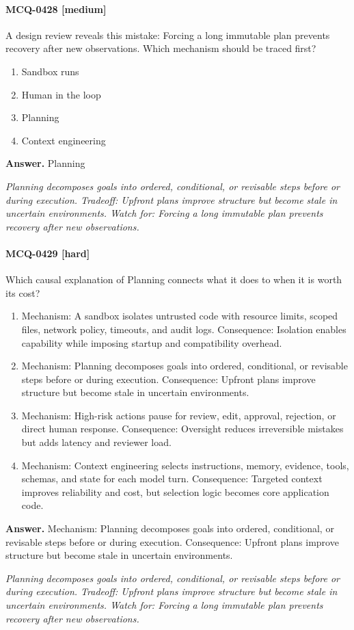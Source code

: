 \paragraph{MCQ-0428 [medium]} A design review reveals this mistake: Forcing a long immutable plan prevents recovery after new observations. Which mechanism should be traced first?
\begin{enumerate}[label=\Alph*.]
\item Sandbox runs
\item Human in the loop
\item Planning
\item Context engineering
\end{enumerate}
\noindent\textbf{Answer.} Planning
\par\textit{Planning decomposes goals into ordered, conditional, or revisable steps before or during execution. Tradeoff: Upfront plans improve structure but become stale in uncertain environments. Watch for: Forcing a long immutable plan prevents recovery after new observations.}
\paragraph{MCQ-0429 [hard]} Which causal explanation of Planning connects what it does to when it is worth its cost?
\begin{enumerate}[label=\Alph*.]
\item Mechanism: A sandbox isolates untrusted code with resource limits, scoped files, network policy, timeouts, and audit logs. Consequence: Isolation enables capability while imposing startup and compatibility overhead.
\item Mechanism: Planning decomposes goals into ordered, conditional, or revisable steps before or during execution. Consequence: Upfront plans improve structure but become stale in uncertain environments.
\item Mechanism: High-risk actions pause for review, edit, approval, rejection, or direct human response. Consequence: Oversight reduces irreversible mistakes but adds latency and reviewer load.
\item Mechanism: Context engineering selects instructions, memory, evidence, tools, schemas, and state for each model turn. Consequence: Targeted context improves reliability and cost, but selection logic becomes core application code.
\end{enumerate}
\noindent\textbf{Answer.} Mechanism: Planning decomposes goals into ordered, conditional, or revisable steps before or during execution. Consequence: Upfront plans improve structure but become stale in uncertain environments.
\par\textit{Planning decomposes goals into ordered, conditional, or revisable steps before or during execution. Tradeoff: Upfront plans improve structure but become stale in uncertain environments. Watch for: Forcing a long immutable plan prevents recovery after new observations.}
